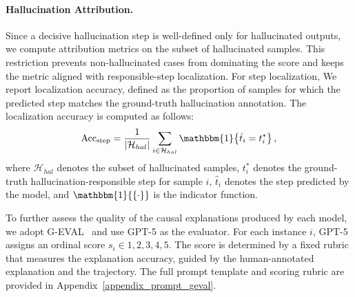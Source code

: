 \paragraph{Hallucination Attribution.} 
Since a decisive hallucination step is well-defined only for hallucinated outputs, we compute attribution metrics on the subset of hallucinated samples. This restriction prevents non-hallucinated cases from dominating the score and keeps the metric aligned with responsible-step localization. For step localization, We report localization accuracy, defined as the proportion of samples for which the predicted step matches the ground-truth hallucination annotation. The localization accuracy is computed as follows:
\begin{equation}
\mathrm{Acc}_{\text{step}}
= \frac{1}{|\mathcal{H}_{hal}|}
\sum_{i \in \mathcal{H}_{hal}} \mathbbm{1}\!\left\{\hat{t}_{i} = t^{\ast}_{i}\right\},
\end{equation}
where $\mathcal{H}_{hal}$ denotes the subset of hallucinated samples, $t^{\ast}_{i}$ denotes the ground-truth hallucination-responsible step for sample $i$, $\hat{t}_{i}$ denotes the step predicted by the model, and $\mathbbm{1} {\left\{ \cdot \right\}}$ is the indicator function.

To further assess the quality of the causal explanations produced by each model, we adopt G-EVAL~\cite{liu2023g} and use GPT-5 as the evaluator. For each instance $i$, GPT-5 assigns an ordinal score $s_i \in {1,2,3,4,5}$. The score is determined by a fixed rubric that measures the explanation accuracy, guided by the human-annotated explanation and the trajectory. The full prompt template and scoring rubric are provided in Appendix~\ref{appendix_prompt_geval}.



